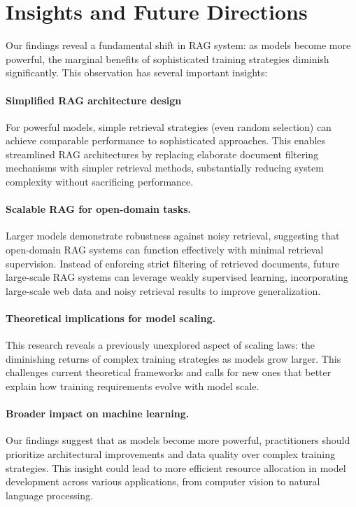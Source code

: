 \section{Insights and Future Directions}

Our findings reveal a fundamental shift in RAG system: as models become more powerful, the marginal benefits of sophisticated training strategies diminish significantly. This observation has several important insights:

\paragraph{Simplified RAG architecture design}

For powerful models, simple retrieval strategies (even random selection) can achieve comparable performance to sophisticated approaches. This enables streamlined RAG architectures by replacing elaborate document filtering mechanisms with simpler retrieval methods, substantially reducing system complexity without sacrificing performance.


\paragraph{Scalable RAG for open-domain tasks.}  
Larger models demonstrate robustness against noisy retrieval, suggesting that open-domain RAG systems can function effectively with minimal retrieval supervision. Instead of enforcing strict filtering of retrieved documents, future large-scale RAG systems can leverage weakly supervised learning, incorporating large-scale web data and noisy retrieval results to improve generalization.

\paragraph{Theoretical implications for model scaling.}

This research reveals a previously unexplored aspect of scaling laws: the diminishing returns of complex training strategies as models grow larger. This challenges current theoretical frameworks and calls for new ones that better explain how training requirements evolve with model scale.

\paragraph{Broader impact on  machine learning.}

Our findings suggest that as models become more powerful, practitioners should prioritize architectural improvements and data quality over complex training strategies. This insight could lead to more efficient resource allocation in model development across various applications, from computer vision to natural language processing.

